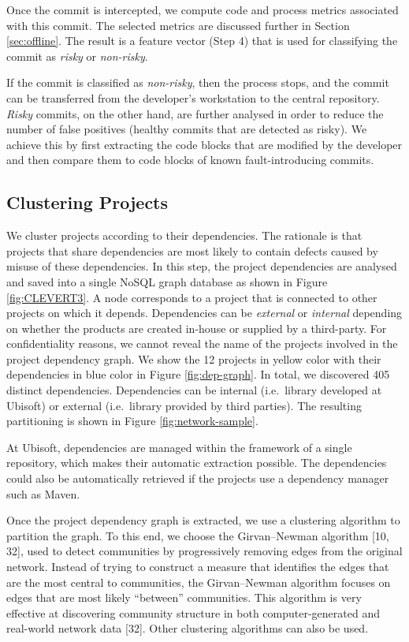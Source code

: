 \documentclass[sigconf]{acmart}
\begin{document}
Once the commit is intercepted, we compute code and process metrics
associated with this commit. The selected metrics are discussed further
in Section \ref{sec:offline}. The result is a feature vector (Step 4)
that is used for classifying the commit as \emph{risky} or
\emph{non-risky}.

If the commit is classified as \emph{non-risky}, then the process stops,
and the commit can be transferred from the developer's workstation to
the central repository. \emph{Risky} commits, on the other hand, are
further analysed in order to reduce the number of false positives
(healthy commits that are detected as risky). We achieve this by first
extracting the code blocks that are modified by the developer and then
compare them to code blocks of known fault-introducing commits.

\subsection{Clustering Projects}\label{sec:clustering}

We cluster projects according to their dependencies. The rationale is
that projects that share dependencies are most likely to contain defects
caused by misuse of these dependencies. In this step, the project
dependencies are analysed and saved into a single NoSQL graph database
as shown in Figure \ref{fig:CLEVERT3}. A node corresponds to a project
that is connected to other projects on which it depends. Dependencies
can be \emph{external} or \emph{internal} depending on whether the
products are created in-house or supplied by a third-party. For
confidentiality reasons, we cannot reveal the name of the projects
involved in the project dependency graph. We show the 12 projects in
yellow color with their dependencies in blue color in Figure
\ref{fig:dep-graph}. In total, we discovered 405 distinct dependencies.
Dependencies can be internal (i.e.~library developed at Ubisoft) or
external (i.e.~library provided by third parties). The resulting
partitioning is shown in Figure \ref{fig:network-sample}.



At Ubisoft, dependencies are managed within the framework of a single
repository, which makes their automatic extraction possible. The
dependencies could also be automatically retrieved if the projects use a
dependency manager such as Maven.



Once the project dependency graph is extracted, we use a clustering
algorithm to partition the graph. To this end, we choose the
Girvan--Newman algorithm [10, 32], used to detect communities by
progressively removing edges from the original network. Instead of
trying to construct a measure that identifies the edges that are the
most central to communities, the Girvan--Newman algorithm focuses on
edges that are most likely ``between'' communities. This algorithm is
very effective at discovering community structure in both
computer-generated and real-world network data [32]. Other
clustering algorithms can also be used.
\end{document}
